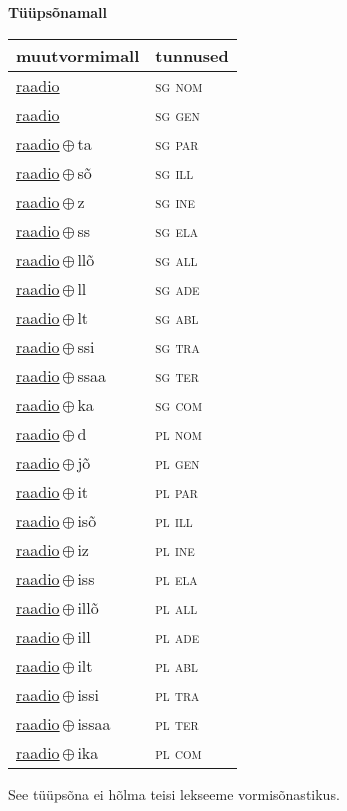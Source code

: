 

\vspace{3.5em}
\noindent \begin{minipage}{\textwidth}
\noindent \textbf{Tüüpsõnamall \,}\\

\begin{sideways}
\begin{tabular}{l l}
muutvormimall & tunnused \\
\hline
\underline{raadio} & \textsc{ sg nom } \\
\underline{raadio} & \textsc{ sg gen } \\
\underline{raadio}\,$\oplus$\,ta & \textsc{ sg par } \\
\underline{raadio}\,$\oplus$\,sõ & \textsc{ sg ill } \\
\underline{raadio}\,$\oplus$\,z & \textsc{ sg ine } \\
\underline{raadio}\,$\oplus$\,ss & \textsc{ sg ela } \\
\underline{raadio}\,$\oplus$\,llõ & \textsc{ sg all } \\
\underline{raadio}\,$\oplus$\,ll & \textsc{ sg ade } \\
\underline{raadio}\,$\oplus$\,lt & \textsc{ sg abl } \\
\underline{raadio}\,$\oplus$\,ssi & \textsc{ sg tra } \\
\underline{raadio}\,$\oplus$\,ssaa & \textsc{ sg ter } \\
\underline{raadio}\,$\oplus$\,ka & \textsc{ sg com } \\
\underline{raadio}\,$\oplus$\,d & \textsc{ pl nom } \\
\underline{raadio}\,$\oplus$\,jõ & \textsc{ pl gen } \\
\underline{raadio}\,$\oplus$\,it & \textsc{ pl par } \\
\underline{raadio}\,$\oplus$\,isõ & \textsc{ pl ill } \\
\underline{raadio}\,$\oplus$\,iz & \textsc{ pl ine } \\
\underline{raadio}\,$\oplus$\,iss & \textsc{ pl ela } \\
\underline{raadio}\,$\oplus$\,illõ & \textsc{ pl all } \\
\underline{raadio}\,$\oplus$\,ill & \textsc{ pl ade } \\
\underline{raadio}\,$\oplus$\,ilt & \textsc{ pl abl } \\
\underline{raadio}\,$\oplus$\,issi & \textsc{ pl tra } \\
\underline{raadio}\,$\oplus$\,issaa & \textsc{ pl ter } \\
\underline{raadio}\,$\oplus$\,ika & \textsc{ pl com } \\
\end{tabular}
\end{sideways}
\label{tab:tüüpsõnamall-raadio}

\end{minipage}

 
\vspace{1em}
\noindent See tüüpsõna ei hõlma teisi lekseeme vormi\-sõnastikus.
